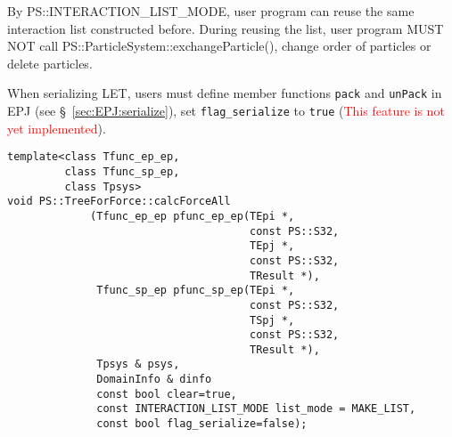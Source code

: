 \begin{itemize}
By PS::INTERACTION\_LIST\_MODE, user program can reuse the same interaction list constructed before. During reusing the list, user program MUST NOT call \newline PS::ParticleSystem::exchangeParticle(), change order of particles or delete particles.

When serializing LET, users must define member functions \texttt{pack} and \texttt{unPack} in EPJ (see \S~\ref{sec:EPJ:serialize}), set \texttt{flag\_serialize} to \texttt{true} (\textcolor{red}{This feature is not yet implemented}).

\end{itemize}

\begin{screen}
\begin{verbatim}
template<class Tfunc_ep_ep,
         class Tfunc_sp_ep,
         class Tpsys>
void PS::TreeForForce::calcForceAll
             (Tfunc_ep_ep pfunc_ep_ep(TEpi *,
                                      const PS::S32,
                                      TEpj *,
                                      const PS::S32,
                                      TResult *),
              Tfunc_sp_ep pfunc_sp_ep(TEpi *,
                                      const PS::S32,
                                      TSpj *,
                                      const PS::S32,
                                      TResult *),
              Tpsys & psys,
              DomainInfo & dinfo
              const bool clear=true,
              const INTERACTION_LIST_MODE list_mode = MAKE_LIST,
              const bool flag_serialize=false);
\end{verbatim}
\end{screen}

